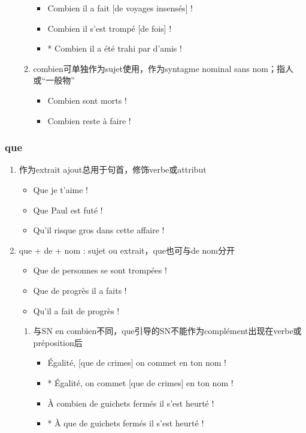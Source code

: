 \documentclass[UTF8]{report}
\begin{document}
\begin{enumerate}
\begin{enumerate}
        \begin{itemize}
            \item Combien il a fait [de voyages insensés] !
            \item Combien il s’est trompé [de fois] !
            \item * Combien il a été trahi par d’amis !
        \end{itemize}
        \item combien可单独作为sujet使用，作为syntagme nominal sans nom；指人或“一般物”
        \begin{itemize}
            \item Combien sont morts !
            \item Combien reste à faire !
        \end{itemize}
    \end{enumerate}
\end{enumerate}



\subsubsection{que}
\begin{enumerate}
    \item 作为extrait ajout总用于句首，修饰verbe或attribut
    \begin{itemize}
        \item Que je t’aime !
        \item Que Paul est futé !
        \item Qu’il risque gros dans cette affaire !
    \end{itemize}
    \item que + de + nom : sujet ou extrait，que也可与de nom分开 
    \begin{itemize}
        \item Que de personnes se sont trompées !
        \item Que de progrès il a faits !
        \item Qu’il a fait de progrès !
    \end{itemize}
    \begin{enumerate}
        \item 与SN en combien不同，que引导的SN不能作为complément出现在verbe或préposition后
        \begin{itemize}
            \item Égalité, [que de crimes] on commet en ton nom !
            \item * Égalité, on commet [que de crimes] en ton nom !
            \item À combien de guichets fermés il s’est heurté !
            \item * À que de guichets fermés il s’est heurté !
        \end{itemize}
    \end{enumerate}
\end{enumerate}
\end{document}
